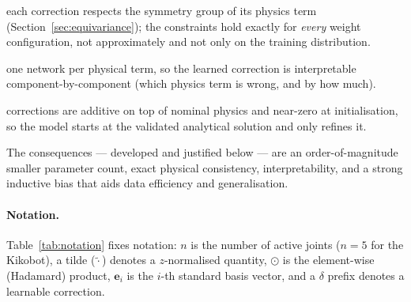 \documentclass[11pt]{article}
\theoremstyle{definition}
\theoremstyle{plain}
\begin{document}
\begin{description}[leftmargin=2.4em,style=nextline,itemsep=1pt]
  \item[\textbf{E}quivariant] each correction respects the symmetry group of its
  physics term (Section~\ref{sec:equivariance}); the constraints hold exactly for
  \emph{every} weight configuration, not approximately and not only on the
  training distribution.
  \item[\textbf{D}ecomposed] one network per physical term, so the learned
  correction is interpretable component-by-component (which physics term is wrong,
  and by how much).
  \item[\textbf{R}esidual] corrections are additive on top of nominal physics and
  near-zero at initialisation, so the model starts at the validated analytical
  solution and only refines it.
\end{description}
The consequences --- developed and justified below --- are an order-of-magnitude
smaller parameter count, exact physical consistency, interpretability, and a
strong inductive bias that aids data efficiency and generalisation.

\paragraph{Notation.}
Table~\ref{tab:notation} fixes notation: $n$ is the number of active joints
($n=5$ for the Kikobot), a tilde ($\tilde{\cdot}$) denotes a $z$-normalised
quantity, $\odot$ is the element-wise (Hadamard) product, $\bm e_i$ is the $i$-th
standard basis vector, and a $\delta$ prefix denotes a learnable correction.
\end{document}
